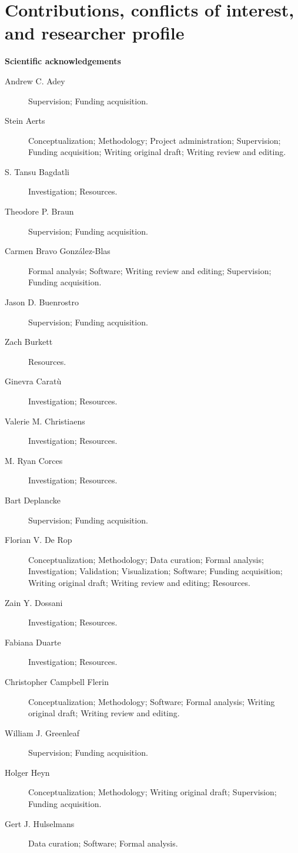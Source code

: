\chapter*{Contributions, conflicts of interest, and researcher profile}

\textbf{Scientific acknowledgements}
\begin{description}
	\item[Andrew C. Adey] Supervision; Funding acquisition.
	\item[Stein Aerts] Conceptualization; Methodology; Project administration; Supervision; Funding acquisition; Writing original draft; Writing review and editing.
	\item[S. Tansu Bagdatli] Investigation; Resources.
	\item[Theodore P. Braun] Supervision; Funding acquisition.
	\item[Carmen Bravo González-Blas] Formal analysis; Software; Writing review and editing; Supervision; Funding acquisition.
	\item[Jason D. Buenrostro] Supervision; Funding acquisition.
	\item[Zach Burkett] Resources.
	\item[Ginevra Caratù] Investigation; Resources.
	\item[Valerie M. Christiaens] Investigation; Resources.
	\item[M. Ryan Corces] Investigation; Resources.
	\item[Bart Deplancke] Supervision; Funding acquisition.
	\item[Florian V. De Rop] Conceptualization; Methodology; Data curation; Formal analysis; Investigation; Validation; Visualization; Software; Funding acquisition; Writing original draft; Writing review and editing; Resources.
	\item[Zain Y. Dossani] Investigation; Resources.
	\item[Fabiana Duarte] Investigation; Resources.
	\item[Christopher Campbell Flerin] Conceptualization; Methodology; Software; Formal analysis; Writing original draft; Writing review and editing.
	\item[William J. Greenleaf] Supervision; Funding acquisition.
	\item[Holger Heyn] Conceptualization; Methodology; Writing original draft; Supervision; Funding acquisition.
	\item[Gert J. Hulselmans] Data curation; Software; Formal analysis.

\end{description}
